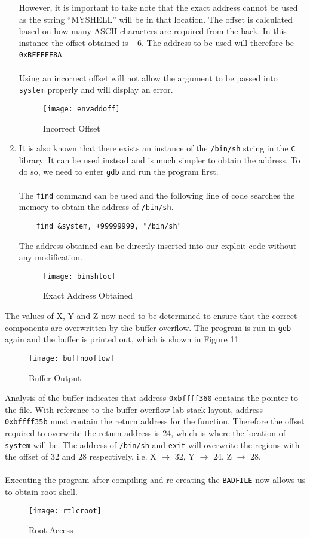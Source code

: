 \documentclass[a4paper,12pt]{article}
\begin{document}
\begin{enumerate}
\begin{enumerate}
		
	\end{enumerate}
	However, it is important to take note that the exact address cannot be used as the string ``MYSHELL'' will be in that location. The offset is calculated based on how many ASCII characters are required from the back. In this instance the offset obtained is $+6$. The address to be used will therefore be \texttt{0xBFFFFE8A}.\\\\
	Using an incorrect offset will not allow the argument to be passed into \texttt{system} properly and will display an error.
	\begin{figure}[H]
		\centering
		\texttt{[image: envaddoff]}
		\caption{Incorrect Offset}
		\label{fig:envaddoff}
	\end{figure}
	\item It is also known that there exists an instance of the \texttt{/bin/sh} string in the \texttt{C} library. It can be used instead and is much simpler to obtain the address. To do so, we need to enter \texttt{gdb} and run the program first. \\\\The \texttt{find} command can be used and the following line of code searches the memory to obtain the address of \texttt{/bin/sh}.
	\begin{verbatim}
	find &system, +99999999, "/bin/sh"
	\end{verbatim}
	The address obtained can be directly inserted into our exploit code without any modification.
	\begin{figure}[H]
		\centering
		\texttt{[image: binshloc]}
		\caption{Exact Address Obtained}
		\label{fig:binshloc}
	\end{figure}
	
\end{enumerate}
The values of X, Y and Z now need to be determined to ensure that the correct components are overwritten by the buffer overflow. The program is run in \texttt{gdb} again and the buffer is printed out, which is shown in Figure 11.
\begin{figure}[H]
	\centering
	\texttt{[image: buffnooflow]}
	\caption{Buffer Output}
	\label{fig:buffnooflow}
\end{figure}
\noindent Analysis of the buffer indicates that address \texttt{0xbffff360} contains the pointer to the file. With reference to the buffer overflow lab stack layout, address \texttt{0xbffff35b} must contain the return address for the function. Therefore the offset required to overwrite the return address is 24, which is where the location of \texttt{system} will be. The address of \texttt{/bin/sh} and \texttt{exit} will overwrite the regions with the offset of 32 and 28 respectively. i.e. X $\rightarrow$ 32, Y $\rightarrow$ 24, Z $\rightarrow$ 28.\\\\Executing the program after compiling and re-creating the \texttt{BADFILE} now allows us to obtain root shell.
\begin{figure}[H]
	\centering
	\texttt{[image: rtlcroot]}
	\caption{Root Access}
	\label{fig:rtlcroot}
\end{figure}
\end{document}
